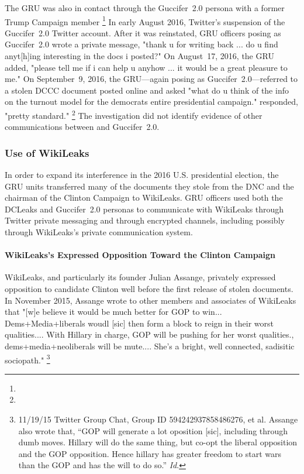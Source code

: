 The GRU was also in contact through the Guccifer~2.0 persona with  a former Trump Campaign member %
\footnote{}
In early August 2016,  Twitter's suspension of the Guccifer~2.0 Twitter account.
After it was reinstated, GRU officers posing as Guccifer~2.0 wrote  a private message, "thank u for writing back ... do u find anyt[h]ing interesting in the docs i posted?"
On August~17, 2016, the GRU added, "please tell me if i can help u anyhow ... it would be a great pleasure to me."
On September~9, 2016, the GRU---again posing as Guccifer~2.0---referred to a stolen DCCC document posted online and asked  "what do u think of the info on the turnout model for the democrats entire presidential campaign."
 responded, "pretty standard."%
\footnote{}
The investigation did not identify evidence of other communications between  and Guccifer~2.0.

\subsubsection{Use of WikiLeaks}

In order to expand its interference in the 2016 U.S. presidential election, the GRU units transferred many of the documents they stole from the DNC and the chairman of the Clinton Campaign to WikiLeaks.
GRU officers used both the DCLeaks and Guccifer~2.0 personas to communicate with WikiLeaks through Twitter private messaging and through encrypted channels, including possibly through WikiLeaks's private communication system.

\paragraph{WikiLeaks's Expressed Opposition Toward the Clinton Campaign}

WikiLeaks, and particularly its founder Julian Assange, privately expressed opposition to candidate Clinton well before the first release of stolen documents.
In November 2015, Assange wrote to other members and associates of WikiLeaks that "[w]e believe it would be much better for GOP to win...
Dems+Media+liberals woudl [sic] then form a block to reign in their worst qualities....
With Hillary in charge, GOP will be pushing for her worst qualities., dems+media+neoliberals will be mute....
She's a bright, well connected, sadisitic sociopath."%
\footnote{11/19/15 Twitter Group Chat, Group ID 594242937858486276, \@WikiLeaks et al.
Assange also wrote that, “GOP will generate a lot oposition [sic], including through dumb moves.
Hillary will do the same thing, but co-opt the liberal opposition and the GOP opposition.
Hence hillary has greater freedom to start wars than the GOP and has the will to do so.” \textit{Id}.}

